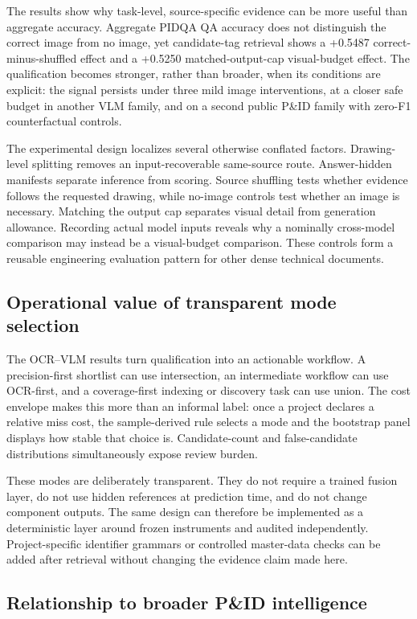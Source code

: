 \documentclass[11pt]{article}
\begin{document}
The results show why task-level, source-specific evidence can be more useful
than aggregate accuracy. Aggregate PIDQA QA accuracy does not distinguish the
correct image from no image, yet candidate-tag retrieval shows a +0.5487
correct-minus-shuffled effect and a +0.5250 matched-output-cap visual-budget
effect. The qualification becomes stronger, rather than broader, when its
conditions are explicit: the signal persists under three mild image
interventions, at a closer safe budget in another VLM family, and on a second
public P\&ID family with zero-F1 counterfactual controls.

The experimental design localizes several otherwise conflated factors.
Drawing-level splitting removes an input-recoverable same-source route.
Answer-hidden manifests separate inference from scoring. Source shuffling
tests whether evidence follows the requested drawing, while no-image controls
test whether an image is necessary. Matching the output cap separates visual
detail from generation allowance. Recording actual model inputs reveals why a
nominally cross-model comparison may instead be a visual-budget comparison.
These controls form a reusable engineering evaluation pattern for other dense
technical documents.

\subsection{Operational value of transparent mode selection}

The OCR--VLM results turn qualification into an actionable workflow. A
precision-first shortlist can use intersection, an intermediate workflow can
use OCR-first, and a coverage-first indexing or discovery task can use union.
The cost envelope makes this more than an informal label: once a project
declares a relative miss cost, the sample-derived rule selects a mode and the
bootstrap panel displays how stable that choice is. Candidate-count and
false-candidate distributions simultaneously expose review burden.

These modes are deliberately transparent. They do not require a trained
fusion layer, do not use hidden references at prediction time, and do not
change component outputs. The same design can therefore be implemented as a
deterministic layer around frozen instruments and audited independently.
Project-specific identifier grammars or controlled master-data checks can be
added after retrieval without changing the evidence claim made here.

\subsection{Relationship to broader P\&ID intelligence}
\end{document}
